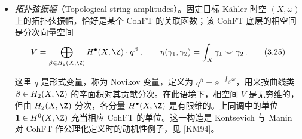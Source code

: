 
\begin{itemize}
\item \emph{拓扑弦振幅}（Topological string amplitudes）。固定目标 Kähler 时空 $(X,\omega)$ 上的拓扑弦振幅，恰好是某个 CohFT 的关联函数；该 CohFT 底层的相空间是分次向量空间
\begin{equation}
  V=\bigoplus_{\beta\in H_{2}(X,\Z)}H^{\bullet}(X,\Z)\cdot q^{\beta}\,,\qquad
  \eta(\gamma_{1},\gamma_{2})=\int_{X}\gamma_{1}\smile\gamma_{2}\,.
  \tag{3.25}
\end{equation}

这里 $q$ 是形式变量，称为 Novikov 变量，定义为 $q^{\beta}=\ee^{-\int_{\beta}\omega}$，用来按曲线类 $\beta\in H_{2}(X,\Z)$ 的辛面积对其贡献分次。在此语境下，相空间 $V$ 是无穷维的，但由 $H_{2}(X,\Z)$ 分次，各分量 $H^{\bullet}(X,\Z)$ 是有限维的。上同调中的单位 $\mathbf{1}\in H^{0}(X,\Z)$ 充当相应 CohFT 的单位。这一构造是 Kontsevich 与 Manin 对 CohFT 作公理化定义时的动机性例子，见 [KM94]。
\end{itemize}

